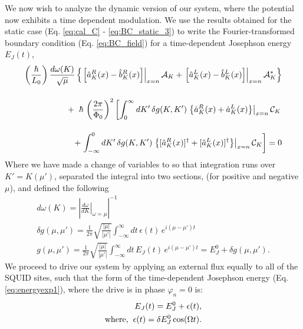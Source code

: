 We now wish to analyze the dynamic version of our system, where the potential now exhibits a time dependent modulation. We use the results obtained for the static case (Eq. \ref{eq:cal_C} - \ref{eq:BC_static_3}) to write the Fourier-transformed boundary condition (Eq. \ref{eq:BC_field}) for a time-dependent Josephson energy $E_J(t)$,
%
\begin{equation}\label{eq:BC_time_dependent}
\begin{split}
    \left(\frac{\hbar}{L_0}\right)
    \frac{d\omega(K)}{\sqrt{\mu}}
    \left\lbrace
    \left.
    \left[\hat{a}^R_K(x) - \hat{b}_K^R(x)\right]
    \right|_{x=n}
    \mathcal{A}_K +
    \left.
    \left[\hat{a}^L_K(x) - \hat{b}^L_K(x)\right]
    \right|_{x=n}
    \mathcal{A}^*_K
    \right\rbrace
    \\[4mm]
    +\hspace{2mm}
    \hbar \, \left(\frac{2\pi}{\Phi_0}\right)^2
    \left[
    \int_{0}^{\infty} dK'\,
    \delta g(K, K')
    \left.
    \left\lbrace \hat{a}^R_K(x) + \hat{a}_K^L(x) \right\rbrace
    \right|_{x=n}
    \mathcal{C}_K\right.
    \\[4mm]
    +
    \left.
    \int_{-\infty}^{0} dK'\,
    \delta g(K, K')
    \left.
    \left\lbrace [\hat{a}^R_K(x)]^\dagger + [\hat{a}_K^L(x)]^\dagger \right\rbrace
    \right|_{x=n}
    \mathcal{C}_K
    \right]
    = 0
\end{split}
\end{equation}
%
Where we have made a change of variables to so that integration runs over $K'=K(\mu')$, separated the integral into two sections, (for positive and negative $\mu$), and defined the following
%
\begin{gather}
    d\omega (K) = 
    \left|\left.\frac{d\omega}{dK}\right|_{\omega=\mu}\right|^{-1}
    \label{eq:shorthand_dw}
    \\
    \delta g(\mu, \mu') = \frac{1}{2 \pi} \sqrt{\frac{|\mu|}{|\mu'|}}
    \int_{-\infty}^{\infty} dt \, \epsilon(t) \, e^{i(\mu - \mu')t}
    \label{eq:energy_FT}
    \\
    g(\mu, \mu') =  \frac{1}{2 \pi} \sqrt{\frac{|\mu|}{|\mu'|}}
    \int_{-\infty}^{\infty} dt \, E_J(t) \, e^{i(\mu - \mu')t}
    = E_J^0 + \delta g(\mu, \mu').
\end{gather}
%
We proceed to drive our system by applying an external flux equally to all of the SQUID sites, such that the form of the time-dependent Josephson energy (Eq. \ref{eq:energyexp1}), where the drive is in phase $\varphi_n=0$ is:
%
\begin{equation}\label{eq:time_dependent_energy}
\begin{split}
    E_J(t) = E^0_J + \epsilon(t),
    \\
    \text{where,} \hspace{2mm}
    \epsilon(t) = \delta E^0_J \cos(\Omega t). 
\end{split}
\end{equation}
